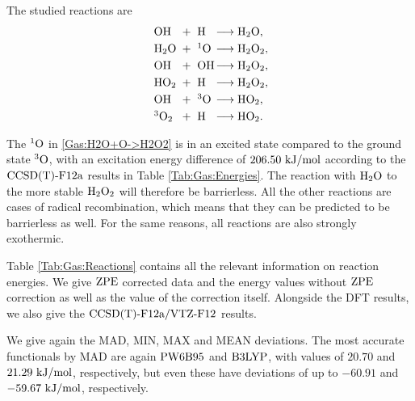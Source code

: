 The studied reactions are
\newcommand\ronebox[1]{\makebox[.8cm][l]{\enmat{#1}}}
\newcommand\rtwobox[1]{\makebox[.7cm][l]{\ \enmat{#1}}}
\newcommand\prodbox[1]{\makebox[1.55cm][l]{\enmat{#1}}}
\begin{subequations}
\begin{align}
   \label{Gas:HO+H->H2O}
   \ronebox{\ho}+\rtwobox{\te{H}}\prodbox{\chemar\hto,} \\ 
   \label{Gas:H2O+O->H2O2}
   \ronebox{\hto}+\rtwobox{^1\te{O}}\prodbox{\chemar\htot,} \\
   \label{Gas:HO+HO->H2O2}
   \ronebox{\ho}+\rtwobox{\ho}\prodbox{\chemar\htot,} \\
   \label{Gas:HO2+H->H2O2}
   \ronebox{\hot}+\rtwobox{\te{H}}\prodbox{\chemar\htot,} \\
   \label{Gas:HO+O->HO2}
   \ronebox{\ho}+\rtwobox{^3\te{O}}\prodbox{\chemar\hot,} \\
   \label{Gas:3O2+H->HO2}
   \ronebox{^3\ot}+\rtwobox{\te{H}}\prodbox{\chemar\hot.}
\end{align}
\label{Gas:Reactions}
\end{subequations}


The ${^1\text{O}}$ in \eqref{Gas:H2O+O->H2O2} is in an excited state
compared to the ground state ${^3\text{O}}$, with an excitation energy difference
of $206.50~\text {kJ/mol}$ according to the $\text{CCSD(T)-F12a}$ results in Table
\ref{Tab:Gas:Energies}. The reaction with $\text H _2 \text O$ to the more stable
$\text H _2 \text O_2$ will therefore be barrierless. All the other reactions are cases of
radical recombination, which means that they can be predicted to be barrierless
as well. For the same reasons, all reactions are also strongly exothermic.

Table \ref{Tab:Gas:Reactions} contains all the relevant information on
reaction energies. We give $\text{ZPE}$ corrected data and the energy
values without $\text{ZPE}$ correction as well as the value of the correction
itself. Alongside the DFT results, we also give the $\text{CCSD(T)-F12a}/\text{VTZ-F}12$ results.

We give again the MAD, MIN, MAX and MEAN deviations.
The most accurate functionals by MAD are again $\text{PW6B95}$
and $\text{B3LYP}$, with values of $20.70$ and $21.29~\text {kJ/mol}$, respectively,
but even these have deviations of up to $-60.91$ and $-59.67~\text {kJ/mol}$,
respectively.

